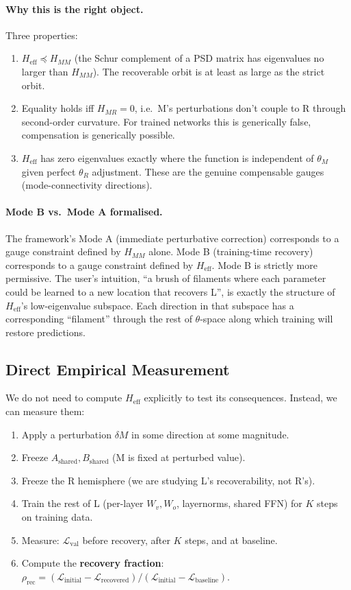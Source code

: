 \documentclass[11pt, a4paper]{article}
\theoremstyle{plain}
\theoremstyle{definition}
\theoremstyle{remark}
\begin{document}
\paragraph{Why this is the right object.}
Three properties:
\begin{enumerate}[nosep]
\item $H_{\text{eff}} \preceq H_{MM}$ (the Schur complement of a PSD matrix has eigenvalues no larger than $H_{MM}$). The recoverable orbit is at least as large as the strict orbit.
\item Equality holds iff $H_{MR} = 0$, i.e.\ M's perturbations don't couple to R through second-order curvature. For trained networks this is generically false, compensation is generically possible.
\item $H_{\text{eff}}$ has zero eigenvalues exactly where the function is independent of $\theta_M$ given perfect $\theta_R$ adjustment. These are the genuine compensable gauges (mode-connectivity directions).
\end{enumerate}

\paragraph{Mode B vs.\ Mode A formalised.}
The framework's Mode A (immediate perturbative correction) corresponds to a gauge constraint defined by $H_{MM}$ alone.
Mode B (training-time recovery) corresponds to a gauge constraint defined by $H_{\text{eff}}$.
Mode B is strictly more permissive.
The user's intuition, ``a brush of filaments where each parameter could be learned to a new location that recovers L'', is exactly the structure of $H_{\text{eff}}$'s low-eigenvalue subspace.
Each direction in that subspace has a corresponding ``filament'' through the rest of $\theta$-space along which training will restore predictions.

\subsection{Direct Empirical Measurement}

We do not need to compute $H_{\text{eff}}$ explicitly to test its consequences.
Instead, we can measure them:

\begin{enumerate}[nosep]
\item Apply a perturbation $\delta M$ in some direction at some magnitude.
\item Freeze $A_{\text{shared}}, B_{\text{shared}}$ (M is fixed at perturbed value).
\item Freeze the R hemisphere (we are studying L's recoverability, not R's).
\item Train the rest of L (per-layer $W_v, W_o$, layernorms, shared FFN) for $K$ steps on training data.
\item Measure: $\mathcal{L}_{\text{val}}$ before recovery, after $K$ steps, and at baseline.
\item Compute the \textbf{recovery fraction}: $\rho_{\text{rec}} = (\mathcal{L}_{\text{initial}} - \mathcal{L}_{\text{recovered}}) / (\mathcal{L}_{\text{initial}} - \mathcal{L}_{\text{baseline}})$.
\end{enumerate}
\end{document}
